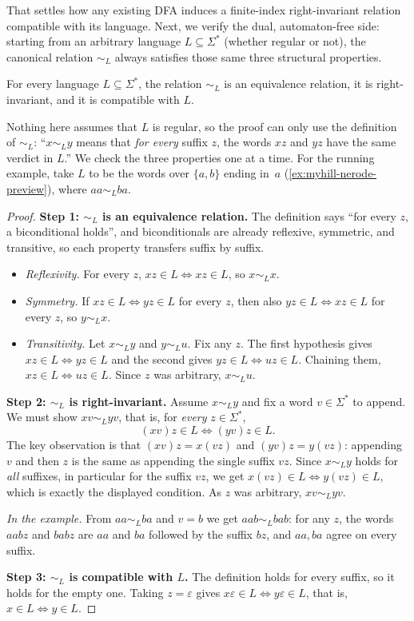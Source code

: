 That settles how any existing DFA induces a finite-index right-invariant relation compatible with its language. Next, we verify the dual, automaton-free side: starting from an arbitrary language $L\subseteq\Sigma^*$ (whether regular or not), the canonical relation $\sim_L$ always satisfies those same three structural properties.

\begin{lemma}
\label{lem:myhill-nerode-right-invariant}
For every language $L\subseteq\Sigma^*$, the relation $\sim_L$ is an
equivalence relation, it is right-invariant, and it is compatible with $L$.
\end{lemma}

Nothing here assumes that $L$ is regular, so the proof can only use the
definition of $\sim_L$: ``$x\sim_L y$ means that \emph{for every} suffix
$z$, the words $xz$ and $yz$ have the same verdict in $L$.''  We check
the three properties one at a time.  For the running example, take $L$
to be the words over $\{a,b\}$ ending in~$a$
(\cref{ex:myhill-nerode-preview}), where $aa\sim_L ba$.

\begin{proof}
\textbf{Step 1: $\sim_L$ is an equivalence relation.}
The definition says ``for every $z$, a biconditional holds'', and
biconditionals are already reflexive, symmetric, and transitive, so each
property transfers suffix by suffix.
\begin{itemize}[nosep]
  \item \emph{Reflexivity.}  For every $z$, $xz\in L\iff xz\in L$, so
  $x\sim_L x$.
  \item \emph{Symmetry.}  If $xz\in L\iff yz\in L$ for every $z$, then
  also $yz\in L\iff xz\in L$ for every $z$, so $y\sim_L x$.
  \item \emph{Transitivity.}  Let $x\sim_L y$ and $y\sim_L u$.  Fix any
  $z$.  The first hypothesis gives $xz\in L\iff yz\in L$ and the second
  gives $yz\in L\iff uz\in L$.  Chaining them,
  $xz\in L\iff uz\in L$.  Since $z$ was arbitrary, $x\sim_L u$.
\end{itemize}

\textbf{Step 2: $\sim_L$ is right-invariant.}
Assume $x\sim_L y$ and fix a word $v\in\Sigma^*$ to append.  We must show
$xv\sim_L yv$, that is, for \emph{every} $z\in\Sigma^*$,
\[
  (xv)z\in L \iff (yv)z\in L.
\]
The key observation is that $(xv)z=x(vz)$ and $(yv)z=y(vz)$: appending
$v$ and then $z$ is the same as appending the single suffix $vz$.  Since
$x\sim_L y$ holds for \emph{all} suffixes, in particular for the suffix
$vz$, we get $x(vz)\in L\iff y(vz)\in L$, which is exactly the
displayed condition.  As $z$ was arbitrary, $xv\sim_L yv$.

\emph{In the example.}  From $aa\sim_L ba$ and $v=b$ we get
$aab\sim_L bab$: for any $z$, the words $aabz$ and $babz$ are $aa$ and
$ba$ followed by the suffix $bz$, and $aa,ba$ agree on every suffix.

\textbf{Step 3: $\sim_L$ is compatible with $L$.}
The definition holds for every suffix, so it holds for the empty one.
Taking $z=\varepsilon$ gives $x\varepsilon\in L\iff y\varepsilon\in L$,
that is, $x\in L\iff y\in L$.
\end{proof}

